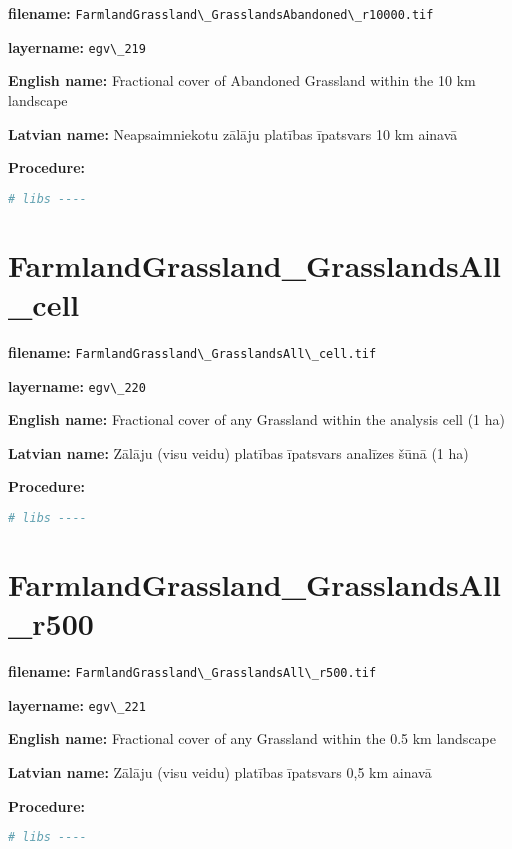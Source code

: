 \documentclass[
]{book}
\newcommand{\passthrough}[1]{#1}
\begin{document}
\textbf{filename:} \passthrough{\lstinline!FarmlandGrassland\_GrasslandsAbandoned\_r10000.tif!}

\textbf{layername:} \passthrough{\lstinline!egv\_219!}

\textbf{English name:} Fractional cover of Abandoned Grassland within the 10 km landscape

\textbf{Latvian name:} Neapsaimniekotu zālāju platības īpatsvars 10 km ainavā

\textbf{Procedure:}

\begin{lstlisting}[language=R]
# libs ----
\end{lstlisting}

\section{FarmlandGrassland\_GrasslandsAll\_cell}\label{ch06.220}

\textbf{filename:} \passthrough{\lstinline!FarmlandGrassland\_GrasslandsAll\_cell.tif!}

\textbf{layername:} \passthrough{\lstinline!egv\_220!}

\textbf{English name:} Fractional cover of any Grassland within the analysis cell (1 ha)

\textbf{Latvian name:} Zālāju (visu veidu) platības īpatsvars analīzes šūnā (1 ha)

\textbf{Procedure:}

\begin{lstlisting}[language=R]
# libs ----
\end{lstlisting}

\section{FarmlandGrassland\_GrasslandsAll\_r500}\label{ch06.221}

\textbf{filename:} \passthrough{\lstinline!FarmlandGrassland\_GrasslandsAll\_r500.tif!}

\textbf{layername:} \passthrough{\lstinline!egv\_221!}

\textbf{English name:} Fractional cover of any Grassland within the 0.5 km landscape

\textbf{Latvian name:} Zālāju (visu veidu) platības īpatsvars 0,5 km ainavā

\textbf{Procedure:}

\begin{lstlisting}[language=R]
# libs ----
\end{lstlisting}
\end{document}
